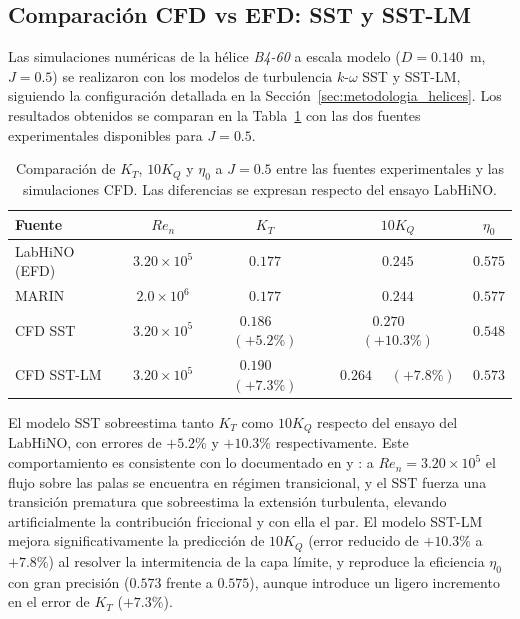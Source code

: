 \subsection{Comparación CFD vs EFD: SST y SST-LM}
\label{sec:helices_cfd_efd}

Las simulaciones numéricas de la hélice \textit{B4-60} a escala modelo ($D = 0.140$~m, $J = 0.5$) se realizaron con los modelos de turbulencia $k$-$\omega$ SST y SST-LM, siguiendo la configuración detallada en la Sección~\ref{sec:metodologia_helices}. Los resultados obtenidos se comparan en la Tabla~\ref{tab:cfd_efd_b460} con las dos fuentes experimentales disponibles para $J = 0.5$.

\begin{table}[htpb]
\centering
\caption{Comparación de $K_T$, $10K_Q$ y $\eta_0$ a $J = 0.5$ entre las fuentes experimentales y las simulaciones CFD. Las diferencias se expresan respecto del ensayo LabHiNO.}
\label{tab:cfd_efd_b460}
\begin{tabular}{lcccc}
\hline
Fuente & $Re_n$ & $K_T$ & $10K_Q$ & $\eta_0$ \\
\hline
LabHiNO (EFD)                    & $3.20 \times 10^5$ & $0.177$ & $0.245$ & $0.575$ \\
MARIN                            & $2.0 \times 10^6$  & $0.177$ & $0.244$ & $0.577$ \\
CFD SST                          & $3.20 \times 10^5$ & $0.186$ ~~$(+5.2\%)$ & $0.270$ ~~$(+10.3\%)$ & $0.548$ \\
CFD SST-LM                       & $3.20 \times 10^5$ & $0.190$ ~~$(+7.3\%)$ & $0.264$ ~~$(+7.8\%)$  & $0.573$ \\
\hline
\end{tabular}
\end{table}

El modelo SST sobreestima tanto $K_T$ como $10K_Q$ respecto del ensayo del LabHiNO, con errores de $+5.2\%$ y $+10.3\%$ respectivamente. Este comportamiento es consistente con lo documentado en \citet{rijpkema2015viscous} y \citet{baltazar2018transition}: a $Re_n = 3.20 \times 10^5$ el flujo sobre las palas se encuentra en régimen transicional, y el SST fuerza una transición prematura que sobreestima la extensión turbulenta, elevando artificialmente la contribución friccional y con ella el par. El modelo SST-LM mejora significativamente la predicción de $10K_Q$ (error reducido de $+10.3\%$ a $+7.8\%$) al resolver la intermitencia de la capa límite, y reproduce la eficiencia $\eta_0$ con gran precisión ($0.573$ frente a $0.575$), aunque introduce un ligero incremento en el error de $K_T$ ($+7.3\%$).

